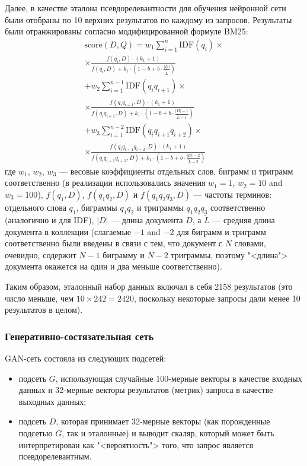 Далее, в качестве эталона псевдорелевантности для обучения нейронной сети были отобраны по 10 верхних результатов по каждому из
запросов. Результаты были отранжированы согласно модифицированной формуле BM25:
\begin{equation}
    \label{eq:wbm25}
    \begin{aligned}
    \text{score}(D,Q) = w_1 \sum_{i=1}^{n} \text{IDF}(q_i) \times \\ \times \frac{f(q_i, D) \cdot (k_1 + 1)}{f(q_i, D) + k_1 \cdot \left(1 - b + b \cdot \frac{|D|}{\tilde{L}}\right)} \\
    + w_2  \sum_{i=1}^{n-1} \text{IDF}(q_i q_{i+1}) \times \\ \times \frac{f(q_i q_{i+1}, D) \cdot (k_1 + 1)}{f(q_i q_{i+1}, D) + k_1 \cdot \left(1 - b + b \cdot \frac{|D| - 1}{\tilde{L} - 1}\right)} \\
    + w_3  \sum_{i=1}^{n-2} \text{IDF}(q_i q_{i+1}q_{i+2}) \times \\ \times \frac{f(q_i q_{i+1}q_{i+2}, D) \cdot (k_1 + 1)}{f(q_i q_{i+1}q_{i+2}, D) + k_1 \cdot \left(1 - b + b \cdot \frac{|D| - 2}{\tilde{L} - 2}\right)}
    \end{aligned}
\end{equation}
где \(w_1\), \(w_2\), \(w_3\) --- весовые коэффициенты отдельных слов, биграмм и триграмм соответственно (в реализации 
использовались значения \(w_1=1\), \(w_2=10\) and \(w_3=100\)), \(f(q_1, D)\), \(f(q_1q_2, D)\) и \(f(q_1q_2q_3, D)\) --- 
частоты терминов: отдельного слова \(q_1\), биграммы \(q_1q_2\) и триграммы \(q_1q_2q_3\) соответственно (аналогично и для IDF),
 \(|D|\) --- длина документа \(D\), а \(\tilde{L}\) --- средняя длина документа в коллекции (слагаемые \(-1\) and \(-2\) 
для биграмм и триграмм соответственно были введены в связи с тем, что документ с \(N\) словами, очевидно, содержит 
\(N-1\) биграмму и \(N-2\) триграммы, поэтому "<длина"> документа окажется на один и два меньше соответственно).

Таким образом, эталонный набор данных включал в себя 2158 результатов
(это число меньше, чем $10\times242=2420$, поскольку некоторые запросы дали менее 10 результатов в целом).

\subsubsection{Генеративно-состязательная сеть}
GAN-сеть состояла из следующих подсетей:
\begin{itemize}
    \item подсеть $G$, использующая случайные 100-мерные векторы в качестве входных данных 
    и 32-мерные векторы результатов (метрик) запроса в качестве выходных данных;
    \item подсеть $D$, которая принимает 32-мерные векторы (как порожденные подсетью $G$, так и эталонные) и выводит скаляр, 
    который может быть интерпретирован как "<вероятность"> того, что запрос является псевдорелевантным.
\end{itemize}

